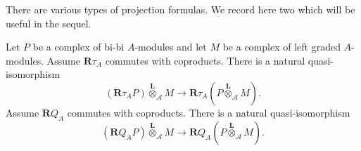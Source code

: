 There are various types of projection formulas.
We record here two which will be useful in the sequel.

\begin{proposition} \label{proposition: projection formula}
  Let \(P\) be a complex of bi-bi \(A\)-modules and let \(M\) be a complex of left graded \(A\)-modules. Assume \(\mathbf{R} \tau_A\) commutes with coproducts. There is a natural quasi-isomorphism
  \begin{displaymath}
    ( \mathbf{R} \tau_A P ) \overset{\mathbf{L}}{\otimes}_{\mathcal A} M \to \mathbf{R} \tau_A \left( P \overset{\mathbf{L}}{\otimes}_{\mathcal A} M \right).
  \end{displaymath}
  Assume \(\mathbf{R} Q_A\) commutes with coproducts. There is a natural quasi-isomorphism
  \begin{displaymath}
    ( \mathbf{R} Q_A P ) \overset{\mathbf{L}}{\otimes}_{\mathcal A} M \to \mathbf{R} Q_A \left( P \overset{\mathbf{L}}{\otimes}_{\mathcal A} M \right).
  \end{displaymath}
\end{proposition}

